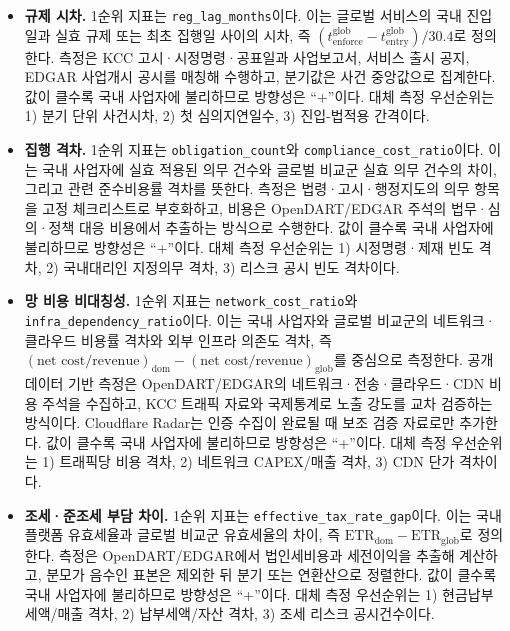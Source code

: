 \documentclass[11pt,a4paper]{report}
\begin{document}
\begin{table}[H]
  \centering
  \small
  \caption{\texorpdfstring{$I^{\mathrm{reg}}$ 지표 매핑}{Ireg 지표 매핑}}\label{tab:ireg_indicator_map}
\begin{itemize}[leftmargin=*, itemsep=0.7em]
  \item \textbf{규제 시차.} 1순위 지표는 \texttt{reg\_lag\_months}이다. 이는 글로벌 서비스의 국내 진입일과 실효 규제 또는 최초 집행일 사이의 시차, 즉 $\left(t^{\mathrm{glob}}_{\mathrm{enforce}}-t^{\mathrm{glob}}_{\mathrm{entry}}\right)/30.4$로 정의한다. 측정은 KCC 고시·시정명령·공표일과 사업보고서, 서비스 출시 공지, EDGAR 사업개시 공시를 매칭해 수행하고, 분기값은 사건 중앙값으로 집계한다. 값이 클수록 국내 사업자에 불리하므로 방향성은 ``+''이다. 대체 측정 우선순위는 1) 분기 단위 사건시차, 2) 첫 심의지연일수, 3) 진입-법적용 간격이다.
  \item \textbf{집행 격차.} 1순위 지표는 \texttt{obligation\_count}와 \texttt{compliance\_cost\_ratio}이다. 이는 국내 사업자에 실효 적용된 의무 건수와 글로벌 비교군 실효 의무 건수의 차이, 그리고 관련 준수비용률 격차를 뜻한다. 측정은 법령·고시·행정지도의 의무 항목을 고정 체크리스트로 부호화하고, 비용은 OpenDART/EDGAR 주석의 법무·심의·정책 대응 비용에서 추출하는 방식으로 수행한다. 값이 클수록 국내 사업자에 불리하므로 방향성은 ``+''이다. 대체 측정 우선순위는 1) 시정명령·제재 빈도 격차, 2) 국내대리인 지정의무 격차, 3) 리스크 공시 빈도 격차이다.
  \item \textbf{망 비용 비대칭성.} 1순위 지표는 \texttt{network\_cost\_ratio}와 \texttt{infra\_dependency\_ratio}이다. 이는 국내 사업자와 글로벌 비교군의 네트워크·클라우드 비용률 격차와 외부 인프라 의존도 격차, 즉 $\left(\text{net cost}/\text{revenue}\right)_{\mathrm{dom}}-\left(\text{net cost}/\text{revenue}\right)_{\mathrm{glob}}$를 중심으로 측정한다. 공개데이터 기반 측정은 OpenDART/EDGAR의 네트워크·전송·클라우드·CDN 비용 주석을 수집하고, KCC 트래픽 자료와 국제통계로 노출 강도를 교차 검증하는 방식이다. Cloudflare Radar는 인증 수집이 완료될 때 보조 검증 자료로만 추가한다. 값이 클수록 국내 사업자에 불리하므로 방향성은 ``+''이다. 대체 측정 우선순위는 1) 트래픽당 비용 격차, 2) 네트워크 CAPEX/매출 격차, 3) CDN 단가 격차이다.
  \item \textbf{조세·준조세 부담 차이.} 1순위 지표는 \texttt{effective\_tax\_rate\_gap}이다. 이는 국내 플랫폼 유효세율과 글로벌 비교군 유효세율의 차이, 즉 $\mathrm{ETR}_{\mathrm{dom}}-\mathrm{ETR}_{\mathrm{glob}}$로 정의한다. 측정은 OpenDART/EDGAR에서 법인세비용과 세전이익을 추출해 계산하고, 분모가 음수인 표본은 제외한 뒤 분기 또는 연환산으로 정렬한다. 값이 클수록 국내 사업자에 불리하므로 방향성은 ``+''이다. 대체 측정 우선순위는 1) 현금납부세액/매출 격차, 2) 납부세액/자산 격차, 3) 조세 리스크 공시건수이다.

\end{itemize}
\end{table}
\end{document}
